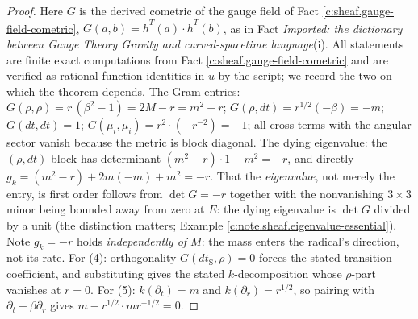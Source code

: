 \documentclass[11pt]{article}
\theoremstyle{definition}
\theoremstyle{plain}
\providecommand{\dtPG}{}\renewcommand{\dtPG}{dt}
\providecommand{\dtS}{}\renewcommand{\dtS}{dt_{\mathrm{S}}}
\providecommand{\hb}{}\renewcommand{\hb}{\bar{h}}
\begin{document}
\begin{proof}
Here $G$ is the derived cometric of the gauge field of Fact \ref{c:sheaf.gauge-field-cometric}, $G(a,b) = \hb^{T}(a) \cdot \hb^{T}(b)$, as in Fact \emph{Imported: the dictionary between Gauge Theory Gravity and curved-spacetime language}(i). All statements are finite exact computations from Fact \ref{c:sheaf.gauge-field-cometric} and are verified as rational-function identities in $u$ by the script; we record the two on which the theorem depends. The Gram entries: $G(\rho,\rho) = r\,(\beta^2 - 1) = 2M - r = m^2 - r$; $G(\rho, \dtPG) = r^{1/2}(-\beta) = -m$; $G(\dtPG,\dtPG) = 1$; $G(\mu_i,\mu_i) = r^2 \cdot (-r^{-2}) = -1$; all cross terms with the angular sector vanish because the metric is block diagonal. The dying eigenvalue: the $(\rho, \dtPG)$ block has determinant $(m^2 - r)\cdot 1 - m^2 = -r$, and directly $g_k = (m^2 - r) + 2m(-m) + m^2 = -r$. That the \emph{eigenvalue}, not merely the entry, is first order follows from $\det G = -r$ together with the nonvanishing $3 \times 3$ minor being bounded away from zero at $E$: the dying eigenvalue is $\det G$ divided by a unit (the distinction matters; Example \ref{c:note.sheaf.eigenvalue-essential}). Note $g_k = -r$ holds \emph{independently of $M$}: the mass enters the radical's direction, not its rate. For (4): orthogonality $G(\dtS, \rho) = 0$ forces the stated transition coefficient, and substituting gives the stated $k$-decomposition whose $\rho$-part vanishes at $r = 0$. For (5): $k(\partial_t) = m$ and $k(\partial_r) = r^{1/2}$, so pairing with $\partial_t - \beta \partial_r$ gives $m - r^{1/2}\cdot m r^{-1/2} = 0$.

\end{proof}
\end{document}
